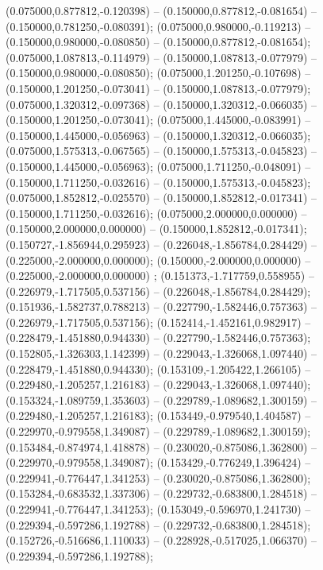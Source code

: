  (0.075000,0.877812,-0.120398) -- (0.150000,0.877812,-0.081654) -- (0.150000,0.781250,-0.080391);
 (0.075000,0.980000,-0.119213) -- (0.150000,0.980000,-0.080850) -- (0.150000,0.877812,-0.081654);
 (0.075000,1.087813,-0.114979) -- (0.150000,1.087813,-0.077979) -- (0.150000,0.980000,-0.080850);
 (0.075000,1.201250,-0.107698) -- (0.150000,1.201250,-0.073041) -- (0.150000,1.087813,-0.077979);
 (0.075000,1.320312,-0.097368) -- (0.150000,1.320312,-0.066035) -- (0.150000,1.201250,-0.073041);
 (0.075000,1.445000,-0.083991) -- (0.150000,1.445000,-0.056963) -- (0.150000,1.320312,-0.066035);
 (0.075000,1.575313,-0.067565) -- (0.150000,1.575313,-0.045823) -- (0.150000,1.445000,-0.056963);
 (0.075000,1.711250,-0.048091) -- (0.150000,1.711250,-0.032616) -- (0.150000,1.575313,-0.045823);
 (0.075000,1.852812,-0.025570) -- (0.150000,1.852812,-0.017341) -- (0.150000,1.711250,-0.032616);
 (0.075000,2.000000,0.000000) -- (0.150000,2.000000,0.000000) -- (0.150000,1.852812,-0.017341);
 (0.150727,-1.856944,0.295923) -- (0.226048,-1.856784,0.284429) -- (0.225000,-2.000000,0.000000);
 (0.150000,-2.000000,0.000000) -- (0.225000,-2.000000,0.000000) ;
 (0.151373,-1.717759,0.558955) -- (0.226979,-1.717505,0.537156) -- (0.226048,-1.856784,0.284429);
 (0.151936,-1.582737,0.788213) -- (0.227790,-1.582446,0.757363) -- (0.226979,-1.717505,0.537156);
 (0.152414,-1.452161,0.982917) -- (0.228479,-1.451880,0.944330) -- (0.227790,-1.582446,0.757363);
 (0.152805,-1.326303,1.142399) -- (0.229043,-1.326068,1.097440) -- (0.228479,-1.451880,0.944330);
 (0.153109,-1.205422,1.266105) -- (0.229480,-1.205257,1.216183) -- (0.229043,-1.326068,1.097440);
 (0.153324,-1.089759,1.353603) -- (0.229789,-1.089682,1.300159) -- (0.229480,-1.205257,1.216183);
 (0.153449,-0.979540,1.404587) -- (0.229970,-0.979558,1.349087) -- (0.229789,-1.089682,1.300159);
 (0.153484,-0.874974,1.418878) -- (0.230020,-0.875086,1.362800) -- (0.229970,-0.979558,1.349087);
 (0.153429,-0.776249,1.396424) -- (0.229941,-0.776447,1.341253) -- (0.230020,-0.875086,1.362800);
 (0.153284,-0.683532,1.337306) -- (0.229732,-0.683800,1.284518) -- (0.229941,-0.776447,1.341253);
 (0.153049,-0.596970,1.241730) -- (0.229394,-0.597286,1.192788) -- (0.229732,-0.683800,1.284518);
 (0.152726,-0.516686,1.110033) -- (0.228928,-0.517025,1.066370) -- (0.229394,-0.597286,1.192788);
